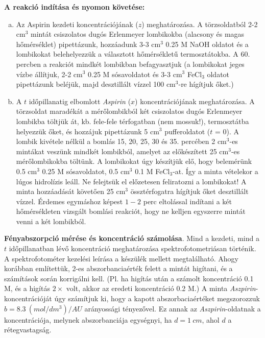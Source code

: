 \documentclass[a4paper, 12pt, twoside]{article}
\begin{document}
\textbf{A reakció indítása és nyomon követése:}

\begin{enumerate}[(a)]
\item Az Aspirin kezdeti koncentrációjának ($z$) meghatározása. A törzsoldatból 2-2 cm$^3$ mintát csiszolatos dugós Erlenmeyer lombikokba (alacsony és magas hőmérséklet) pipettázunk, hozzáadunk 3-3 cm$^3$ 0.25 M NaOH oldatot és a lombikokat belehelyezzük a választott hőmérsékletű termosztátokba. A 60. percben a reakciót mindkét lombikban befagyasztjuk (a lombikokat jeges vízbe állítjuk, 2-2 cm$^3$ 0.25 M sósavoldatot és 3-3 cm$^3$ FeCl$_3$ oldatot pipettázunk beléjük, majd desztillált vízzel 100 cm$^3$-re hígítjuk őket.)

\item A $t$ időpillanatig elbomlott \emph{Aspirin} ($x$) koncentrációjának meghatározása. A törzsoldat maradékát a mérőlombikból két csiszolatos dugós Erlenmeyer lombikba töltjük át, kb. fele-fele térfogatban (nem mossuk!), termosztátba helyezzük őket, és hozzájuk pipettázunk 5 cm$^3$ pufferoldatot ($t$ = 0). A lombik kivétele nélkül a bomlás 15, 20, 25, 30 és 35. percében 2 cm$^3$-es mintákat veszünk mindkét lombikból, amelyet az előkészített 25 cm$^3$-es mérőlombikokba töltünk. A lombikokat úgy készítjük elő, hogy belemérünk 0.5 cm$^3$ 0.25 M sósavoldatot, 0.5 cm$^3$ 0.1 M FeCl$_3$-at. Így a minta vételekor a lúgos hidrolízis leáll. Ne felejtsük el előzetesen feliratozni a lombikokat! A minta hozzáadását követően 25 cm$^3$ össztérfogatra hígítjuk őket desztillált vízzel. Érdemes egymáshoz képest $1 - 2$ perc eltolással indítani a két hőmérsékleten vizsgált bomlási reakciót, hogy ne kelljen egyszerre mintát venni a két lombikból.
\end{enumerate}

\textbf{Fényabszorpció mérése és koncentráció számolása}. Mind a kezdeti, mind a $t$ időpillanatban lévő koncentráció meghatározása spektrofotometriásan történik. A spektrofotométer kezelési leírása a készülék mellett megtalálható. Ahogy korábban említettük, 2-es abszorbanciaérték felett a mintát higítani, és a számítások során korrigálni kell. (Pl. ha higítás után a számolt koncentráció 0.1 M, és a higítás $2\times$ volt, akkor az eredeti koncentráció 0.2 M.) A minta \emph{Aszpirin}-koncentrációját úgy számítjuk ki, hogy a kapott abszorbaciaértéket megszorozzuk $b = 8.3~(mol/dm^3) / AU$ arányossági tényezővel. Ez annak az \emph{Aszpirin}-oldatnak a koncentrációja, melynek abszorbanciája egységnyi, ha $d = 1~cm$, ahol $d$ a rétegvastagság.
\end{document}
